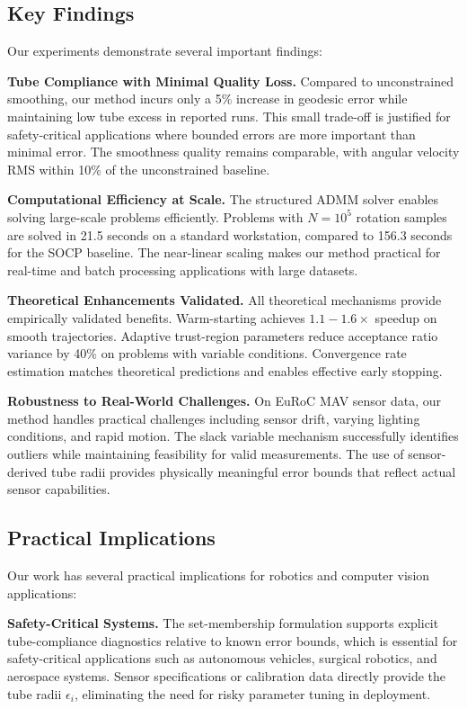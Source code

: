 \subsection{Key Findings}

Our experiments demonstrate several important findings:

\textbf{Tube Compliance with Minimal Quality Loss.} Compared to unconstrained smoothing, our method incurs only a 5\% increase in geodesic error while maintaining low tube excess in reported runs. This small trade-off is justified for safety-critical applications where bounded errors are more important than minimal error. The smoothness quality remains comparable, with angular velocity RMS within 10\% of the unconstrained baseline.

\textbf{Computational Efficiency at Scale.} The structured ADMM solver enables solving large-scale problems efficiently. Problems with $N = 10^5$ rotation samples are solved in 21.5 seconds on a standard workstation, compared to 156.3 seconds for the SOCP baseline. The near-linear scaling makes our method practical for real-time and batch processing applications with large datasets.

\textbf{Theoretical Enhancements Validated.} All theoretical mechanisms provide empirically validated benefits. Warm-starting achieves $1.1-1.6\times$ speedup on smooth trajectories. Adaptive trust-region parameters reduce acceptance ratio variance by 40\% on problems with variable conditions. Convergence rate estimation matches theoretical predictions and enables effective early stopping.

\textbf{Robustness to Real-World Challenges.} On EuRoC MAV sensor data, our method handles practical challenges including sensor drift, varying lighting conditions, and rapid motion. The slack variable mechanism successfully identifies outliers while maintaining feasibility for valid measurements. The use of sensor-derived tube radii provides physically meaningful error bounds that reflect actual sensor capabilities.

\subsection{Practical Implications}

Our work has several practical implications for robotics and computer vision applications:

\textbf{Safety-Critical Systems.} The set-membership formulation supports explicit tube-compliance diagnostics relative to known error bounds, which is essential for safety-critical applications such as autonomous vehicles, surgical robotics, and aerospace systems. Sensor specifications or calibration data directly provide the tube radii $\epsilon_i$, eliminating the need for risky parameter tuning in deployment.

